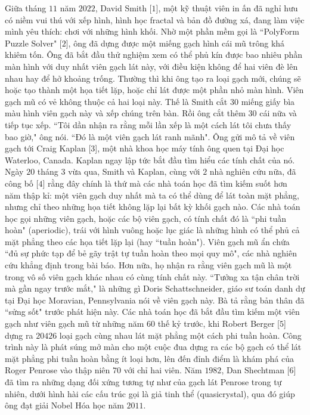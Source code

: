 \begin{multicols}{2}	
	Giữa tháng $11$ năm $2022$, David Smith [$1$], một kỹ thuật viên in ấn đã nghỉ hưu có niềm vui thú với xếp hình, hình học fractal và bản đồ đường xá, đang làm việc mình yêu thích: chơi với những hình khối. Nhờ một phần mềm gọi là ``PolyForm Puzzle Solver" [$2$], ông đã dựng được một miếng gạch hình cái mũ trông khá khiêm tốn. Ông đã bắt đầu thử nghiệm xem có thể phủ kín được bao nhiêu phần màn hình với duy nhất viên gạch lát này, với điều kiện không để hai viên đè lên nhau hay để hở khoảng trống.
	\vskip 0.1cm
	Thường thì khi ông tạo ra loại gạch mới, chúng sẽ hoặc tạo thành một họa tiết lặp, hoặc chỉ lát được một phần nhỏ màn hình. Viên gạch mũ có vẻ không thuộc cả hai loại này. Thế là Smith cắt $30$ miếng giấy bìa màu hình viên gạch này và xếp chúng trên bàn. Rồi ông cắt thêm $30$ cái nữa và tiếp tục xếp. ``Tôi dần nhận ra rằng mỗi lần xếp là một cách lát tôi chưa thấy bao giờ," ông nói. ``Đó là một viên gạch lát ranh mãnh". Ông gửi mô tả về viên gạch tới Craig Kaplan [$3$], một nhà khoa học máy tính ông quen tại Đại học Waterloo, Canada. Kaplan ngay lập tức bắt đầu tìm hiểu các tính chất của nó.
	\vskip 0.1cm
	Ngày $20$ tháng $3$ vừa qua, Smith và Kaplan, cùng với $2$ nhà nghiên cứu nữa, đã công bố [$4$] rằng đây chính là thứ mà các nhà toán học đã tìm kiếm suốt hơn năm thập kỉ: một viên gạch duy nhất mà ta có thể dùng để lát toàn mặt phẳng, nhưng chỉ theo những họa tiết không lặp lại bất kỳ khối gạch nào. Các nhà toán học gọi những viên gạch, hoặc các bộ viên gạch, có tính chất đó là ``phi tuần hoàn" (aperiodic), trái với hình vuông hoặc lục giác là những hình có thể phủ cả mặt phẳng theo các họa tiết lặp lại (hay ``tuần hoàn").
	\vskip 0.1cm
	Viên gạch mũ ẩn chứa ``đủ sự phức tạp để bẻ gãy trật tự tuần hoàn theo mọi quy mô", các nhà nghiên cứu khẳng định trong bài báo. Hơn nữa, họ nhận ra rằng viên gạch mũ là một trong vô số viên gạch khác nhau có cùng tính chất này.
	\vskip 0.1cm
	``Tưởng xa tận chân trời mà gần ngay trước mắt,"  là những gì  Doris Schattschneider, giáo sư toán danh dự tại Đại học Moravian, Pennsylvania nói về viên gạch này.  Bà tả rằng bản thân đã ``sửng sốt" trước phát hiện này.
	\vskip 0.1cm
	Các nhà toán học đã bắt đầu tìm kiếm một viên gạch như viên gạch mũ từ những năm 60 thế kỷ trước, khi Robert Berger  [$5$] dựng ra $20426$ loại gạch cùng nhau lát mặt phẳng một cách phi tuần hoàn. Công trình này là phát súng mở màn cho một cuộc đua dựng ra các bộ gạch có thể lát mặt phẳng phi tuần hoàn bằng ít loại hơn, lên đến đỉnh điểm là khám phá của Roger Penrose vào thập niên $70$ với chỉ hai viên. Năm $1982$, Dan Shechtman [$6$] đã tìm ra những dạng đối xứng tương tự như của gạch lát Penrose trong tự nhiên, dưới hình hài các cấu trúc gọi là giả tinh thể (quasicrystal), qua đó giúp ông đạt giải Nobel Hóa học năm $2011$.

\end{multicols}

